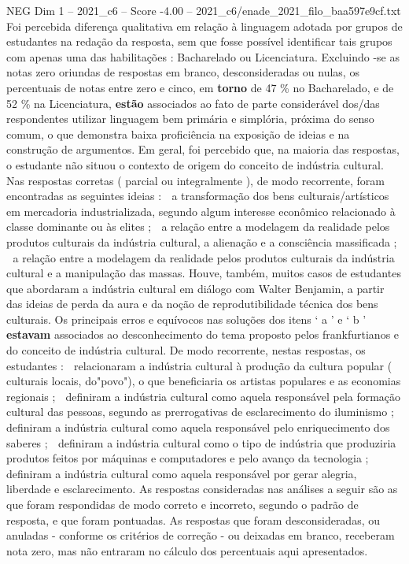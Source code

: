 \begin{textsample}{NEG Dim 1 – 2021\_c6 – Score -4.00 – 2021\_c6/enade\_2021\_filo\_baa597e9cf.txt}
Foi percebida diferença qualitativa em relação à linguagem adotada por grupos de estudantes na redação da resposta, sem que fosse possível identificar tais grupos com apenas uma das habilitações : Bacharelado ou Licenciatura.
Excluindo -se as notas zero oriundas de respostas em branco, desconsideradas ou nulas, os percentuais de notas entre zero e cinco, em \textbf{torno} de 47 \% no Bacharelado, e de 52 \% na Licenciatura, \textbf{estão} associados ao fato de parte considerável dos/das respondentes utilizar linguagem bem primária e simplória, próxima do senso comum, o que demonstra baixa proficiência na exposição de ideias e na construção de argumentos.
Em geral, foi percebido que, na maioria das respostas, o estudante não situou o contexto de origem do conceito de indústria cultural.
Nas respostas corretas ( parcial ou integralmente ), de modo recorrente, foram encontradas as seguintes ideias :  a transformação dos bens culturais/artísticos em mercadoria industrializada, segundo algum interesse econômico relacionado à classe dominante ou às elites ;  a relação entre a modelagem da realidade pelos produtos culturais da indústria cultural, a alienação e a consciência massificada ;  a relação entre a modelagem da realidade pelos produtos culturais da indústria cultural e a manipulação das massas.
Houve, também, muitos casos de estudantes que abordaram a indústria cultural em diálogo com Walter Benjamin, a partir das ideias de perda da aura e da noção de reprodutibilidade técnica dos bens culturais.
Os principais erros e equívocos nas soluções dos itens ‘ a ’ e ‘ b ' \textbf{estavam} associados ao desconhecimento do tema proposto pelos frankfurtianos e do conceito de indústria cultural.
De modo recorrente, nestas respostas, os estudantes :  relacionaram a indústria cultural à produção da cultura popular ( culturais locais, do"povo"), o que beneficiaria os artistas populares e as economias regionais ;  definiram a indústria cultural como aquela responsável pela formação cultural das pessoas, segundo as prerrogativas de esclarecimento do iluminismo ;  definiram a indústria cultural como aquela responsável pelo enriquecimento dos saberes ;  definiram a indústria cultural como o tipo de indústria que produziria produtos feitos por máquinas e computadores e pelo avanço da tecnologia ;  definiram a indústria cultural como aquela responsável por gerar alegria, liberdade e esclarecimento.
As respostas consideradas nas análises a seguir são as que foram respondidas de modo correto e incorreto, segundo o padrão de resposta, e que foram pontuadas.
As respostas que foram desconsideradas, ou anuladas - conforme os critérios de correção - ou deixadas em branco, receberam nota zero, mas não entraram no cálculo dos percentuais aqui apresentados.

\end{textsample}
